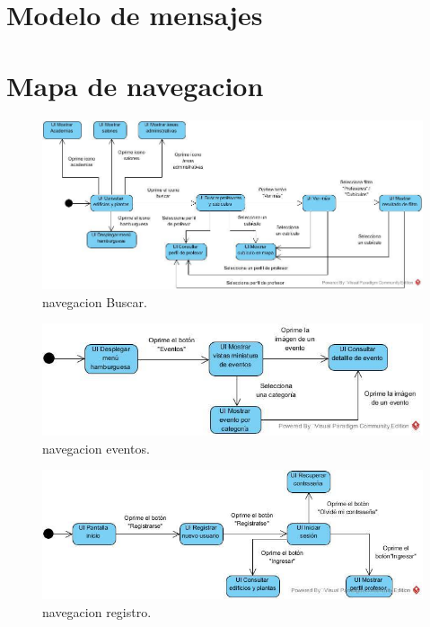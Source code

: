 \documentclass[oneside,10pt]{book}
\begin{document}
\chapter{Modelo de mensajes}


\chapter{Mapa de navegacion}

	\begin{figure}[htbp!]
		\centering
			\includegraphics[width=.5\textwidth]{mapa_nave/imagenesnav/buscar1}
		\caption{navegacion Buscar.}
	\end{figure}
	
	\begin{figure}[htbp!]
		\centering
			\includegraphics[width=.5\textwidth]{mapa_nave/imagenesnav/eventos}
		\caption{navegacion eventos.}
	\end{figure}
	
	\begin{figure}[htbp!]
		\centering
			\includegraphics[width=.5\textwidth]{mapa_nave/imagenesnav/registro}
		\caption{navegacion registro.}
	\end{figure}
\end{document}
